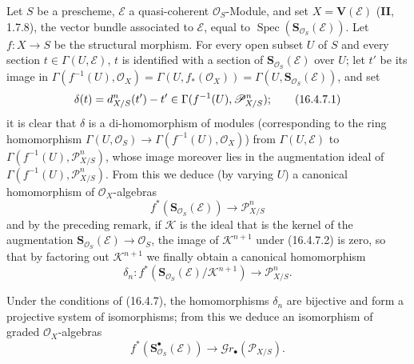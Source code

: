 \begin{env}[16.4.7]
\label{IV.16.4.7}
Let $S$ be a prescheme, $\mathscr{E}$ a quasi-coherent $\mathcal{O}_S$-Module,
and set $X=\mathbf{V}(\mathscr{E})$ (\textbf{II}, 1.7.8), the vector bundle
associated to $\mathscr{E}$, equal to
$\operatorname{Spec}(\mathbf{S}_{\mathcal{O}_S}(\mathscr{E}))$. Let
$f:X\to S$ be the structural morphism. For every open subset $U$ of $S$ and every
section $t\in\Gamma(U,\mathscr{E})$, $t$ is identified with a section of
$\mathbf{S}_{\mathcal{O}_S}(\mathscr{E})$ over $U$; let $t'$ be its
image in
$\Gamma(f^{-1}(U),\mathcal{O}_X)=\Gamma(U,f_*(\mathcal{O}_X))=
\Gamma(U,\mathbf{S}_{\mathcal{O}_S}(\mathscr{E}))$, and set
\[
  \delta(t)=d_{X/S}^n(t')- t'\in
  \Gamma(f^{-1}(U),\mathscr{P}_{X/S}^n);
  \tag{16.4.7.1}
  \label{IV.16.4.7.1}
\]
it is clear that $\delta$ is a di-homomorphism of modules (corresponding to
the ring homomorphism
$\Gamma(U,\mathcal{O}_S)\to\Gamma(f^{-1}(U),\mathcal{O}_X)$) from
$\Gamma(U,\mathscr{E})$ to $\Gamma(f^{-1}(U),\mathscr{P}_{X/S}^n)$, whose
image moreover lies in the augmentation ideal of
$\Gamma(f^{-1}(U),\mathscr{P}_{X/S}^n)$. From this we deduce (by varying $U$)
a canonical homomorphism of $\mathcal{O}_X$-algebras
\[
  f^*(\mathbf{S}_{\mathcal{O}_S}(\mathscr{E}))
  \longrightarrow\mathscr{P}_{X/S}^n
  \tag{16.4.7.2}
  \label{IV.16.4.7.2}
\]
and by the preceding remark, if $\mathscr{K}$ is the ideal that is the kernel of
the augmentation $\mathbf{S}_{\mathcal{O}_S}(\mathscr{E})\to\mathcal{O}_S$,
the image of $\mathscr{K}^{n+1}$ under (16.4.7.2) is zero, so that by
factoring out $\mathscr{K}^{n+1}$ we finally obtain a canonical homomorphism
\[
  \delta_n:f^*(\mathbf{S}_{\mathcal{O}_S}(\mathscr{E})/
  \mathscr{K}^{n+1})\longrightarrow\mathscr{P}_{X/S}^n.
  \tag{16.4.7.3}
  \label{IV.16.4.7.3}
\]
\end{env}

\begin{proposition}[16.4.8]
\label{IV.16.4.8}
Under the conditions of \textup{(16.4.7)}, the homomorphisms $\delta_n$ are bijective and
form a projective system of isomorphisms; from this we deduce an isomorphism of
graded $\mathcal{O}_X$-algebras
\[
  f^*(\mathbf{S}_{\mathcal{O}_S}^{\bullet}(\mathscr{E}))
  \longrightarrow\mathscr{G}r_\bullet(\mathscr{P}_{X/S}).
  \tag{16.4.8.1}
  \label{IV.16.4.8.1}
\]
\end{proposition}

